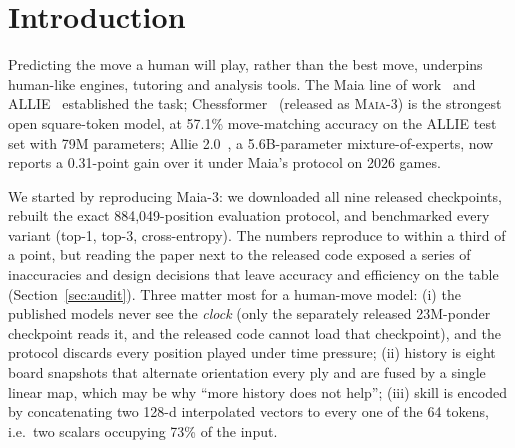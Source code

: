 \section{Introduction}
Predicting the move a human will play, rather than the best move, underpins human-like engines,
tutoring and analysis tools. The Maia line of work~\cite{maia1,maia2} and ALLIE~\cite{allie}
established the task; Chessformer~\cite{chessformer} (released as \textsc{Maia-3}) is the strongest
open square-token model, at 57.1\% move-matching accuracy on the ALLIE test set with 79M parameters;
Allie 2.0~\cite{allie2}, a 5.6B-parameter mixture-of-experts, now reports a 0.31-point gain over it
under Maia's protocol on 2026 games.

We started by reproducing Maia-3: we downloaded all nine released checkpoints, rebuilt the exact
884,049-position evaluation protocol, and benchmarked every variant (top-1, top-3, cross-entropy).
The numbers reproduce to within a third of a point, but reading the paper next to the released code
exposed a series of inaccuracies and design decisions that leave accuracy and efficiency on the table
(Section~\ref{sec:audit}). Three matter most for a human-move model:
(i) the published models never see the \emph{clock} (only the separately released 23M-ponder
checkpoint reads it, and the released code cannot load that checkpoint), and the protocol discards
every position played under time pressure; (ii) history is eight board snapshots that alternate
orientation every ply and are fused by a single linear map, which may be why ``more history does not
help''; (iii) skill is encoded by
concatenating two 128-d interpolated vectors to every one of the 64 tokens, i.e.\ two scalars
occupying 73\% of the input.

